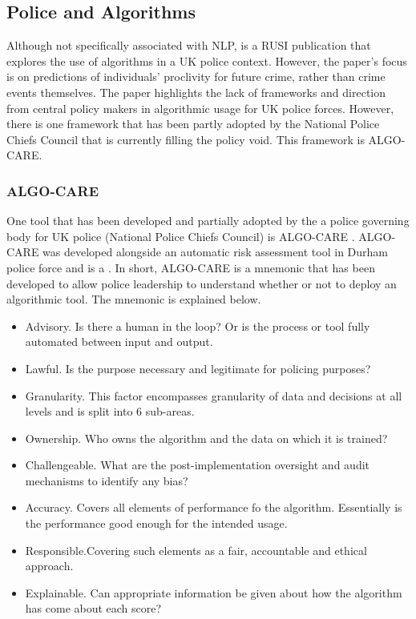 \subsection{Police and Algorithms}

Although not specifically associated with NLP,  \textcite{babuta2018machine} is a RUSI publication that explores the use of algorithms in a UK police context. However, the paper’s focus is on predictions of individuals’ proclivity for future crime, rather than crime events themselves. The paper highlights the lack of frameworks and direction from central policy makers in algorithmic usage for UK police forces. However, there is one framework that has been partly adopted by the National Police Chiefs Council that is currently filling the policy void. This framework is ALGO-CARE.

\subsubsection{ALGO-CARE}

One tool that has been developed and partially adopted by the a police governing body for UK police (National Police Chiefs Council) is ALGO-CARE  \parencite{oswald2018algorithmic} . ALGO-CARE was developed alongside an automatic risk assessment tool in Durham police force and is a  \parencite{oswald2018algorithmic}. In short, ALGO-CARE is a mnemonic that has been developed to allow police leadership to understand whether or not to deploy an algorithmic tool. The mnemonic is explained below.


\begin{itemize}
\item{Advisory.} Is there a human in the loop? Or is the process or tool fully automated between input and output. 
\item{Lawful.} Is the purpose necessary and legitimate for policing purposes?
\item{Granularity.} This factor encompasses granularity of data and decisions at all levels and is split into 6 sub-areas.
\item{Ownership.} Who owns the algorithm and the data on which it is trained?
\item{Challengeable.} What are the post-implementation oversight and audit mechanisms to identify any bias?
\item{Accuracy.} Covers all elements of performance fo the algorithm. Essentially is the performance good enough for the intended usage.
\item{Responsible.}Covering such elements as a fair, accountable and ethical approach.
\item{Explainable.} Can appropriate information be given about how the algorithm has come about each score?
\end{itemize}


